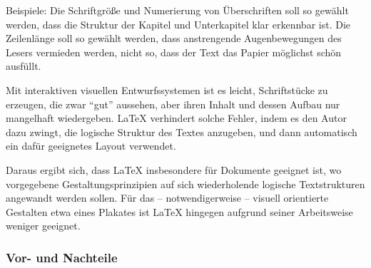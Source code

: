 Beispiele:
Die Schriftgröße und Numerierung von Überschriften soll so
gewählt werden, dass die Struktur der Kapitel und Unterkapitel
klar erkennbar ist.
Die Zeilenlänge soll so gewählt werden, dass anstrengende
Augenbewegungen des Lesers vermieden werden, nicht so, dass der
Text das Papier möglichst schön ausfüllt.
 
Mit interaktiven visuellen Entwurfssystemen ist es leicht,  
Schriftstücke zu erzeugen, die zwar "`gut"' aussehen,
aber ihren Inhalt und dessen Aufbau nur mangelhaft wiedergeben.
\LaTeX{} verhindert solche
Fehler, indem es den Autor dazu zwingt, die logische
Struktur des Textes anzugeben, und dann automatisch ein dafür
geeignetes Layout verwendet.

Daraus ergibt sich, dass \LaTeX{} insbesondere für  Dokumente geeignet 
ist, wo vorgegebene Gestaltungsprinzipien auf sich wiederholende
logische Textstrukturen angewandt werden sollen. 
Für das -- notwendigerweise -- visuell orientierte Gestalten
etwa eines Plakates ist \LaTeX{} hingegen 
aufgrund seiner Arbeitsweise weniger geeignet.

\subsubsection{Vor- und Nachteile}

